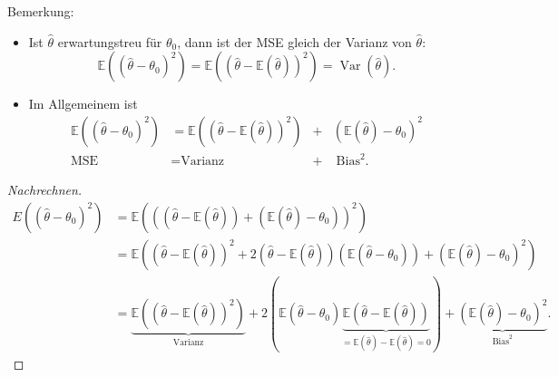 \documentclass{tstextbook}
\DeclareMathOperator{\Var}{Var}
\newcommand{\E}{\mathbb E}
\begin{document}
\begin{remark}
	Bemerkung:
	\begin{itemize}
		\item Ist $ \hat{\theta} $ erwartungstreu für $ \theta_0 $, dann ist der MSE gleich der Varianz von $ \hat{\theta} $: 
		\[
			\E\left(\left(\hat{\theta}-\theta_0\right)^2\right) = \E\left(\left(\hat{\theta}-\E\left(\hat{\theta}\right)\right)^2\right) = \Var(\hat{\theta}).
		\]
		
		\item Im Allgemeinem ist
		\[
		\begin{aligned}
		\E\left(\left(\hat{\theta}-\theta_0\right)^2\right) & = \E\left(\left(\hat{\theta}-\E\left(\hat{\theta}\right)\right)^2\right) & + & \left(\E\left(\hat{\theta}\right)-\theta_0\right)^2 \\
		\text{MSE} & = \text{Varianz} & + & \; \text{Bias}^2.
		\end{aligned}
		\]
	\end{itemize}
\end{remark}

\begin{proof}[Nachrechnen]
	\[
	\begin{aligned}
		E\left(\left(\hat{\theta}-\theta_0\right)^2\right) & = \E\left(\left(\left(\hat{\theta}-\E\left(\hat{\theta}\right)\right)+ \left(\E\left(\hat{\theta}\right)-\theta_0\right)\right)^2\right) \\
		& = \E\left(\left(\hat{\theta}-\E\left(\hat{\theta}\right)\right)^2+2\left(\hat{\theta}-\E\left(\hat{\theta}\right)\right)\left(\E\left(\hat{\theta}-\theta_0\right)\right)+\left(\E\left(\hat{\theta}\right)-\theta_0\right)^2\right) \\
		& = \underbrace{\E\left(\left(\hat{\theta}-\E\left(\hat{\theta}\right)\right)^2\right)}_{\text{Varianz}}+2\left(\E\left(\hat{\theta}-\theta_0\right)\underbrace{\E\left(\hat{\theta}-\E\left(\hat{\theta}\right)\right)}_{=\E(\hat{\theta})-\E(\hat{\theta})=0}\right)+\underbrace{\left(\E\left(\hat{\theta}\right)-\theta_0\right)^2}_{\text{Bias}^2} .
	\end{aligned}
	\]

\end{proof}
\end{document}
